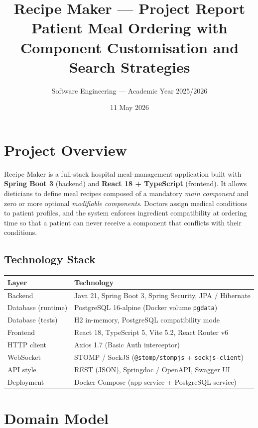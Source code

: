 \documentclass[12pt,a4paper]{article}
\title{\textbf{Recipe Maker — Project Report}\\[0.4em]
  \large Patient Meal Ordering with Component Customisation and Search Strategies}
\author{Software Engineering — Academic Year 2025/2026}
\date{11 May 2026}
\begin{document}
\maketitle
\tableofcontents
\newpage

\section{Project Overview}
Recipe Maker is a full-stack hospital meal-management application built with
\textbf{Spring Boot 3} (backend) and \textbf{React 18 + TypeScript} (frontend).
It allows dieticians to define meal recipes composed of a mandatory
\emph{main component} and zero or more optional \emph{modifiable components}.
Doctors assign medical conditions to patient profiles, and the system enforces
ingredient compatibility at ordering time so that a patient can never receive
a component that conflicts with their conditions.

\subsection{Technology Stack}
\begin{center}
\begin{tabular}{ll}
\toprule
\textbf{Layer} & \textbf{Technology} \\
\midrule
Backend      & Java 21, Spring Boot 3, Spring Security, JPA / Hibernate \\
Database (runtime) & PostgreSQL 16-alpine (Docker volume \texttt{pgdata}) \\
Database (tests)   & H2 in-memory, PostgreSQL compatibility mode \\
Frontend     & React 18, TypeScript 5, Vite 5.2, React Router v6 \\
HTTP client  & Axios 1.7 (Basic Auth interceptor) \\
WebSocket    & STOMP / SockJS (\texttt{@stomp/stompjs} + \texttt{sockjs-client}) \\
API style    & REST (JSON), Springdoc / OpenAPI, Swagger UI \\
Deployment   & Docker Compose (app service + PostgreSQL service) \\
\bottomrule
\end{tabular}
\end{center}

\section{Domain Model}
\end{document}

